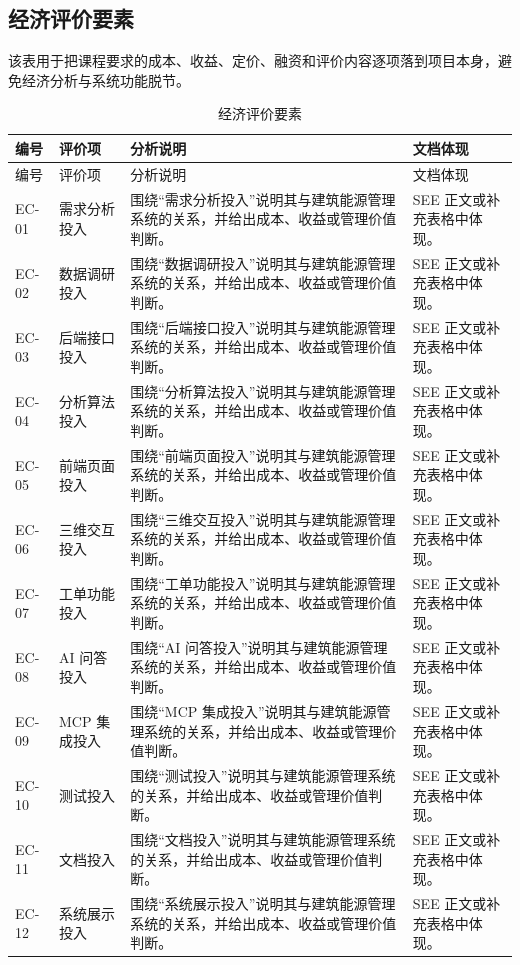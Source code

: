 \documentclass[12pt,a4paper]{ctexart}
\begin{document}
\subsection{经济评价要素}
该表用于把课程要求的成本、收益、定价、融资和评价内容逐项落到项目本身，避免经济分析与系统功能脱节。
\begin{longtable}{L{1.8cm}L{3.3cm}L{6.2cm}L{4.0cm}}
\caption{经济评价要素}\\
\toprule
编号 & 评价项 & 分析说明 & 文档体现 \\
\midrule
\endfirsthead
\toprule
编号 & 评价项 & 分析说明 & 文档体现 \\
\midrule
\endhead
EC-01 & 需求分析投入 & 围绕“需求分析投入”说明其与建筑能源管理系统的关系，并给出成本、收益或管理价值判断。 & SEE 正文或补充表格中体现。 \\
EC-02 & 数据调研投入 & 围绕“数据调研投入”说明其与建筑能源管理系统的关系，并给出成本、收益或管理价值判断。 & SEE 正文或补充表格中体现。 \\
EC-03 & 后端接口投入 & 围绕“后端接口投入”说明其与建筑能源管理系统的关系，并给出成本、收益或管理价值判断。 & SEE 正文或补充表格中体现。 \\
EC-04 & 分析算法投入 & 围绕“分析算法投入”说明其与建筑能源管理系统的关系，并给出成本、收益或管理价值判断。 & SEE 正文或补充表格中体现。 \\
EC-05 & 前端页面投入 & 围绕“前端页面投入”说明其与建筑能源管理系统的关系，并给出成本、收益或管理价值判断。 & SEE 正文或补充表格中体现。 \\
EC-06 & 三维交互投入 & 围绕“三维交互投入”说明其与建筑能源管理系统的关系，并给出成本、收益或管理价值判断。 & SEE 正文或补充表格中体现。 \\
EC-07 & 工单功能投入 & 围绕“工单功能投入”说明其与建筑能源管理系统的关系，并给出成本、收益或管理价值判断。 & SEE 正文或补充表格中体现。 \\
EC-08 & AI 问答投入 & 围绕“AI 问答投入”说明其与建筑能源管理系统的关系，并给出成本、收益或管理价值判断。 & SEE 正文或补充表格中体现。 \\
EC-09 & MCP 集成投入 & 围绕“MCP 集成投入”说明其与建筑能源管理系统的关系，并给出成本、收益或管理价值判断。 & SEE 正文或补充表格中体现。 \\
EC-10 & 测试投入 & 围绕“测试投入”说明其与建筑能源管理系统的关系，并给出成本、收益或管理价值判断。 & SEE 正文或补充表格中体现。 \\
EC-11 & 文档投入 & 围绕“文档投入”说明其与建筑能源管理系统的关系，并给出成本、收益或管理价值判断。 & SEE 正文或补充表格中体现。 \\
EC-12 & 系统展示投入 & 围绕“系统展示投入”说明其与建筑能源管理系统的关系，并给出成本、收益或管理价值判断。 & SEE 正文或补充表格中体现。 \\

\end{longtable}
\end{document}
